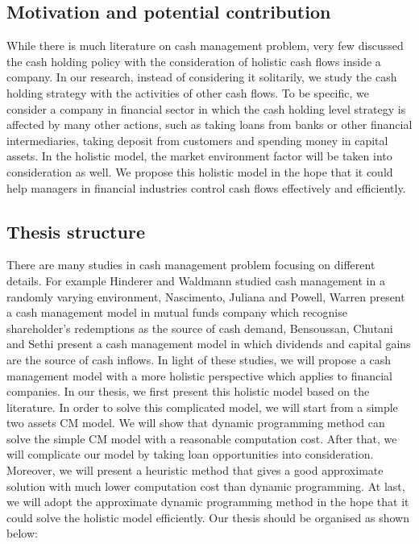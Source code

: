 \documentclass[12pt]{article}
\begin{document}
\subsection{Motivation and potential contribution}
While there is much literature on cash management problem, very few discussed the cash holding policy with the consideration of holistic cash flows inside a company. In our research, instead of considering it solitarily, we study the cash holding strategy with the activities of other cash flows. To be specific, we consider a company in financial sector in which the cash holding level strategy is affected by many other actions, such as taking loans from banks or other financial intermediaries, taking deposit from customers and spending money in capital assets. In the holistic model, the market environment factor will be taken into consideration as well. We propose this holistic model in the hope that it could help managers in financial industries control cash flows effectively and efficiently.

\subsection{Thesis structure}
There are many studies in cash management problem focusing on different details. For example Hinderer and Waldmann \cite{hinderer2001cash} studied cash management in a randomly varying environment, Nascimento, Juliana and Powell, Warren\cite{nascimento2010dynamic} present a cash management model in mutual funds company which recognise shareholder's redemptions as the source of cash demand, Bensoussan, Chutani and Sethi\cite{optimal} present a cash management model in which dividends and capital gains are the source of cash inflows. In light of these studies, we will propose a cash management model with a more holistic perspective which applies to financial companies. In our thesis, we first present this holistic model based on the literature. In order to solve this complicated model, we will start from a simple two assets CM model. We will show that dynamic programming method can solve the simple CM model with a reasonable computation cost. After that, we will complicate our model by taking loan opportunities into consideration. Moreover, we will present a heuristic method that gives a good approximate solution with much lower computation cost than dynamic programming. At last, we will adopt the approximate dynamic programming method in the hope that it could solve the holistic model efficiently. Our thesis should be organised as shown below:
\end{document}
